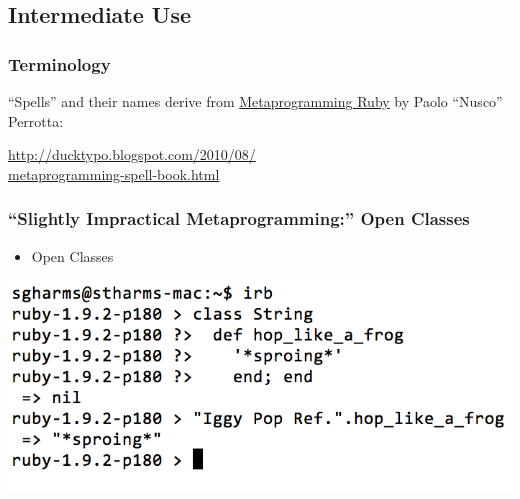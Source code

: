 \documentclass[slidestop,compress,mathserif]{beamer}
\begin{document}
\subsection{Intermediate Use} %
\label{sub:intermediate_use}

\begin{frame}
	\frametitle{Terminology}
	``Spells'' and their names derive from \underline{Metaprogramming Ruby} by Paolo ``Nusco'' Perrotta:
	\vskip 0.5cm
	\begin{center}
		\underline{http://ducktypo.blogspot.com/2010/08/} \\
		\underline{metaprogramming-spell-book.html}
	\end{center}
\end{frame}

\begin{frame}
	\frametitle{``Slightly Impractical Metaprogramming:''  Open Classes}
	\begin{itemize}
		\item Open Classes
	\end{itemize}
		\includegraphics[scale=0.42]{img/open_class.png}
\end{frame}
\end{document}
